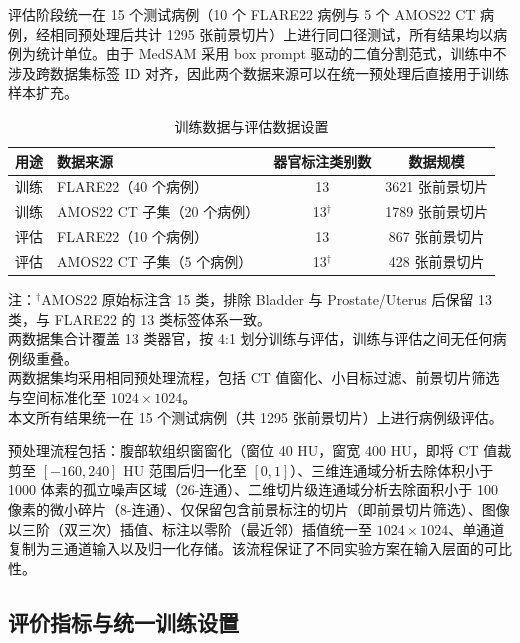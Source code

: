 评估阶段统一在 15 个测试病例（10 个 FLARE22 病例与 5 个 AMOS22 CT 病例，经相同预处理后共计 1295 张前景切片）上进行同口径测试，所有结果均以病例为统计单位。由于 MedSAM 采用 box prompt 驱动的二值分割范式，训练中不涉及跨数据集标签 ID 对齐，因此两个数据来源可以在统一预处理后直接用于训练样本扩充。

\begin{table}[htbp]
  \centering
  \caption{训练数据与评估数据设置}
  \label{tab:data_split}
  \small
  \begin{tabular}{llcc}
    \hline
    用途 & 数据来源 & 器官标注类别数 & 数据规模 \\
    \hline
    训练 & FLARE22\cite{ma2022flare}（40 个病例） & 13 & 3621 张前景切片 \\
    训练 & AMOS22\cite{ji2022amos} CT 子集（20 个病例） & 13$^\dag$ & 1789 张前景切片 \\
    评估 & FLARE22\cite{ma2022flare}（10 个病例） & 13 & 867 张前景切片 \\
    评估 & AMOS22\cite{ji2022amos} CT 子集（5 个病例） & 13$^\dag$ & 428 张前景切片 \\
    \hline
  \end{tabular}
  \vspace{2pt}
  \parbox{\textwidth}{\footnotesize 注：$^\dag$AMOS22 原始标注含 15 类，排除 Bladder 与 Prostate/Uterus 后保留 13 类，与 FLARE22 的 13 类标签体系一致。\\
  两数据集合计覆盖 13 类器官，按 4:1 划分训练与评估，训练与评估之间无任何病例级重叠。\\
  两数据集均采用相同预处理流程，包括 CT 值窗化、小目标过滤、前景切片筛选与空间标准化至 $1024 \times 1024$。\\
  本文所有结果统一在 15 个测试病例（共 1295 张前景切片）上进行病例级评估。}
\end{table}

预处理流程包括：腹部软组织窗窗化（窗位 40 HU，窗宽 400 HU，即将 CT 值裁剪至 $[-160, 240]$ HU 范围后归一化至 $[0, 1]$）、三维连通域分析去除体积小于 1000 体素的孤立噪声区域（26-连通）、二维切片级连通域分析去除面积小于 100 像素的微小碎片（8-连通）、仅保留包含前景标注的切片（即前景切片筛选）、图像以三阶（双三次）插值、标注以零阶（最近邻）插值统一至 $1024 \times 1024$、单通道复制为三通道输入以及归一化存储。该流程保证了不同实验方案在输入层面的可比性。

\subsection{评价指标与统一训练设置}

